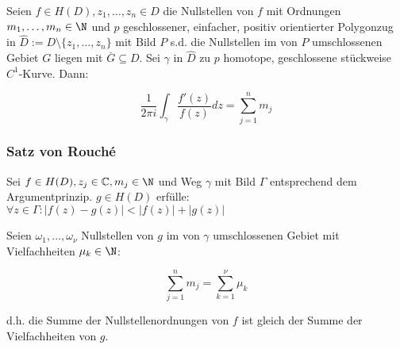 Seien $f \in H(D), z_1, \dots, z_n \in D$ die Nullstellen von $f$ mit Ordnungen $m_1, \dots, m_n \in \N$ und $p$ geschlossener, einfacher, positiv orientierter Polygonzug in $\hat D := D \setminus \{z_1,\dots,z_n\}$ mit Bild $P$ s.d. die Nullstellen im von $P$ umschlossenen Gebiet $G$ liegen mit $\overline G \subseteq D$. Sei $\gamma$ in $\hat D$ zu $p$ homotope, geschlossene stückweise $C^1$-Kurve. Dann:

$$\frac{1}{2\pi i} \int_\gamma \frac{f'(z)}{f(z)} dz = \sum_{j=1}^n m_j$$

\subsubsection*{Satz von Rouché}

Sei $f \in H(D), z_j \in \C, m_j \in \N$ und Weg $\gamma$ mit Bild $\Gamma$ entsprechend dem Argumentprinzip. $g \in H(D)$ erfülle: $\forall z \in \Gamma : |f(z)-g(z)| < |f(z)| + |g(z)|$

Seien $\omega_1, \dots, \omega_\nu$ Nullstellen von $g$ im von $\gamma$ umschlossenen Gebiet mit Vielfachheiten $\mu_k \in \N$:

\vspace*{-2mm}
$$\sum_{j=1}^n m_j = \sum_{k=1}^\nu \mu_k$$

d.h. die Summe der Nullstellenordnungen von $f$ ist gleich der Summe der Vielfachheiten von $g$.
